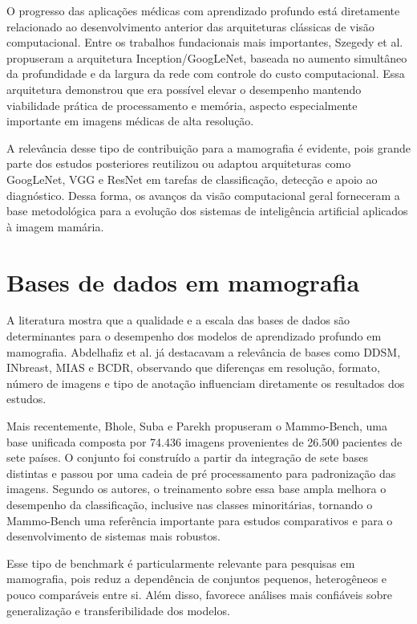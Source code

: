 \documentclass[
    12pt,
    openright,
    oneside,
    a4paper,
    english,
    brazil
]{abntex2}
\begin{document}
O progresso das aplicações médicas com aprendizado profundo está diretamente relacionado ao desenvolvimento anterior das arquiteturas clássicas de visão computacional. Entre os trabalhos fundacionais mais importantes, Szegedy et al. \cite{szegedy2014} propuseram a arquitetura Inception/GoogLeNet, baseada no aumento simultâneo da profundidade e da largura da rede com controle do custo computacional. Essa arquitetura demonstrou que era possível elevar o desempenho mantendo viabilidade prática de processamento e memória, aspecto especialmente importante em imagens médicas de alta resolução.

A relevância desse tipo de contribuição para a mamografia é evidente, pois grande parte dos estudos posteriores reutilizou ou adaptou arquiteturas como GoogLeNet, VGG e ResNet em tarefas de classificação, detecção e apoio ao diagnóstico. Dessa forma, os avanços da visão computacional geral forneceram a base metodológica para a evolução dos sistemas de inteligência artificial aplicados à imagem mamária.

\section{Bases de dados em mamografia}

A literatura mostra que a qualidade e a escala das bases de dados são determinantes para o desempenho dos modelos de aprendizado profundo em mamografia. Abdelhafiz et al. \cite{abdelhafiz2019} já destacavam a relevância de bases como DDSM, INbreast, MIAS e BCDR, observando que diferenças em resolução, formato, número de imagens e tipo de anotação influenciam diretamente os resultados dos estudos.

Mais recentemente, Bhole, Suba e Parekh \cite{bhole2025} propuseram o Mammo-Bench, uma base unificada composta por 74.436 imagens provenientes de 26.500 pacientes de sete países. O conjunto foi construído a partir da integração de sete bases distintas e passou por uma cadeia de pré processamento para padronização das imagens. Segundo os autores, o treinamento sobre essa base ampla melhora o desempenho da classificação, inclusive nas classes minoritárias, tornando o Mammo-Bench uma referência importante para estudos comparativos e para o desenvolvimento de sistemas mais robustos.

Esse tipo de benchmark é particularmente relevante para pesquisas em mamografia, pois reduz a dependência de conjuntos pequenos, heterogêneos e pouco comparáveis entre si. Além disso, favorece análises mais confiáveis sobre generalização e transferibilidade dos modelos.
\end{document}
